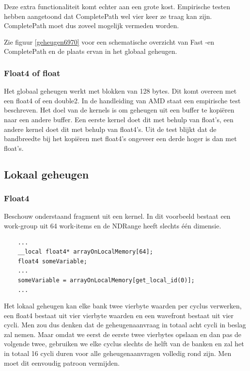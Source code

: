Deze extra functionaliteit komt echter aan een grote kost. Empirische testen \cite[p.~6-3]{amd} hebben aangetoond dat CompletePath wel vier keer ze traag kan zijn. CompletePath moet dus zoveel mogelijk vermeden worden.

Zie figuur \ref{geheugen6970} voor een schematische overzicht van Fast -en CompletePath en de plaats ervan in het globaal geheugen.

\subsubsection{Float4 of float}
Het globaal geheugen werkt met blokken van 128 bytes. Dit komt overeen met een float4 of een double2. In de handleiding van AMD staat een empirische test beschreven. Het doel van de kernels is om geheugen uit een buffer te kopi\"eren naar een andere buffer. Een eerste kernel doet dit met behulp van float's, een andere kernel doet dit met behulp van float4's. Uit de test blijkt dat de bandbreedte bij het kopi\"eren met float4's ongeveer een derde hoger is dan met float's. \cite[p.~6-11]{amd}

\subsection{Lokaal geheugen}
\subsubsection{Float4}
\label{fl4BankConfl}
Beschouw onderstaand fragment uit een kernel. In dit voorbeeld bestaat een work-group uit 64 work-items en de NDRange heeft slechts \'e\'en dimensie.
\begin{lstlisting}
    ...
    __local float4* arrayOnLocalMemory[64];
    float4 someVariable;
    ...
    someVariable = arrayOnLocalMemory[get_local_id(0)];
    ...
\end{lstlisting}
Het lokaal geheugen kan elke bank twee vierbyte waarden per cyclus verwerken, een float4 bestaat uit vier vierbyte waarden en een wavefront bestaat uit vier cycli. Men zou dus denken dat de geheugenaanvraag in totaal acht cycli in beslag zal nemen. Maar omdat we eerst de eerste twee vierbytes opslaan en dan pas de volgende twee, gebruiken we elke cyclus slechts de helft van de banken en zal het in totaal 16 cycli duren voor alle geheugenaanvragen volledig rond zijn. Men moet dit eenvoudig patroon vermijden.

